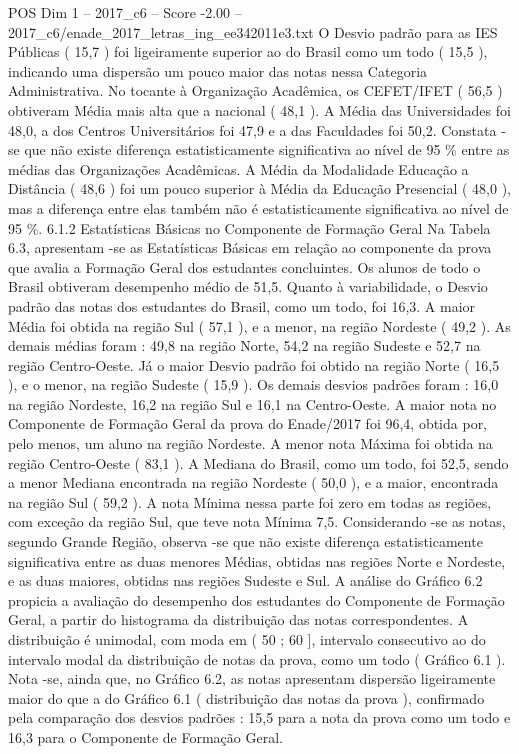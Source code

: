 \begin{textsample}{POS Dim 1 – 2017\_c6 – Score -2.00 – 2017\_c6/enade\_2017\_letras\_ing\_ee342011e3.txt}
O Desvio padrão para as IES Públicas ( 15,7 ) foi ligeiramente superior ao do Brasil como um todo ( 15,5 ), indicando uma dispersão um pouco maior das notas nessa Categoria Administrativa.
No tocante à Organização Acadêmica, os CEFET/IFET ( 56,5 ) obtiveram Média mais alta que a nacional ( 48,1 ).
A Média das Universidades foi 48,0, a dos Centros Universitários foi 47,9 e a das Faculdades foi 50,2.
Constata -se que não existe diferença estatisticamente significativa ao nível de 95 \% entre as médias das Organizações Acadêmicas.
A Média da Modalidade Educação a Distância ( 48,6 ) foi um pouco superior à Média da Educação Presencial ( 48,0 ), mas a diferença entre elas também não é estatisticamente significativa ao nível de 95 \%. 6.1.2 Estatísticas Básicas no Componente de Formação Geral Na Tabela 6.3, apresentam -se as Estatísticas Básicas em relação ao componente da prova que avalia a Formação Geral dos estudantes concluintes.
Os alunos de todo o Brasil obtiveram desempenho médio de 51,5.
Quanto à variabilidade, o Desvio padrão das notas dos estudantes do Brasil, como um todo, foi 16,3.
A maior Média foi obtida na região Sul ( 57,1 ), e a menor, na região Nordeste ( 49,2 ).
As demais médias foram : 49,8 na região Norte, 54,2 na região Sudeste e 52,7 na região Centro-Oeste.
Já o maior Desvio padrão foi obtido na região Norte ( 16,5 ), e o menor, na região Sudeste ( 15,9 ).
Os demais desvios padrões foram : 16,0 na região Nordeste, 16,2 na região Sul e 16,1 na Centro-Oeste.
A maior nota no Componente de Formação Geral da prova do Enade/2017 foi 96,4, obtida por, pelo menos, um aluno na região Nordeste.
A menor nota Máxima foi obtida na região Centro-Oeste ( 83,1 ).
A Mediana do Brasil, como um todo, foi 52,5, sendo a menor Mediana encontrada na região Nordeste ( 50,0 ), e a maior, encontrada na região Sul ( 59,2 ).
A nota Mínima nessa parte foi zero em todas as regiões, com exceção da região Sul, que teve nota Mínima 7,5.
Considerando -se as notas, segundo Grande Região, observa -se que não existe diferença estatisticamente significativa entre as duas menores Médias, obtidas nas regiões Norte e Nordeste, e as duas maiores, obtidas nas regiões Sudeste e Sul.
A análise do Gráfico 6.2 propicia a avaliação do desempenho dos estudantes do Componente de Formação Geral, a partir do histograma da distribuição das notas correspondentes.
A distribuição é unimodal, com moda em ( 50 ; 60 ], intervalo consecutivo ao do intervalo modal da distribuição de notas da prova, como um todo ( Gráfico 6.1 ).
Nota -se, ainda que, no Gráfico 6.2, as notas apresentam dispersão ligeiramente maior do que a do Gráfico 6.1 ( distribuição das notas da prova ), confirmado pela comparação dos desvios padrões : 15,5 para a nota da prova como um todo e 16,3 para o Componente de Formação Geral.

\end{textsample}
